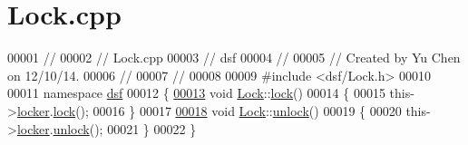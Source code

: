 \hypertarget{_lock_8cpp_source}{}\section{Lock.\+cpp}
\label{_lock_8cpp_source}

\begin{DoxyCode}
00001 \textcolor{comment}{//}
00002 \textcolor{comment}{//  Lock.cpp}
00003 \textcolor{comment}{//  dsf}
00004 \textcolor{comment}{//}
00005 \textcolor{comment}{//  Created by Yu Chen on 12/10/14.}
00006 \textcolor{comment}{//}
00007 \textcolor{comment}{//}
00008 
00009 \textcolor{preprocessor}{#}\textcolor{preprocessor}{include} \textcolor{preprocessor}{<}\textcolor{preprocessor}{dsf}\textcolor{preprocessor}{/}\textcolor{preprocessor}{Lock}\textcolor{preprocessor}{.}\textcolor{preprocessor}{h}\textcolor{preprocessor}{>}
00010 
00011 \textcolor{keyword}{namespace} \hyperlink{namespacedsf_aa16e735f29587f4485b56fc46746f7a9}{dsf}
00012 \{
\hypertarget{_lock_8cpp_source_l00013}{}\hyperlink{classdsf_1_1_lock_ae521388d861fe66b9c6e2f09811b0d4b}{00013}     \textcolor{keywordtype}{void} \hyperlink{namespacedsf_aa16e735f29587f4485b56fc46746f7a9}{Lock}::\hyperlink{namespacedsf_aa16e735f29587f4485b56fc46746f7a9}{lock}()
00014     \{
00015         \textcolor{keyword}{this}->\hyperlink{namespacedsf_aa16e735f29587f4485b56fc46746f7a9}{locker}.\hyperlink{namespacedsf_aa16e735f29587f4485b56fc46746f7a9}{lock}();
00016     \}
00017 
\hypertarget{_lock_8cpp_source_l00018}{}\hyperlink{classdsf_1_1_lock_a3d03f801920d458b3c3c402a0f4af323}{00018}     \textcolor{keywordtype}{void} \hyperlink{namespacedsf_aa16e735f29587f4485b56fc46746f7a9}{Lock}::\hyperlink{namespacedsf_aa16e735f29587f4485b56fc46746f7a9}{unlock}()
00019     \{
00020         \textcolor{keyword}{this}->\hyperlink{namespacedsf_aa16e735f29587f4485b56fc46746f7a9}{locker}.\hyperlink{namespacedsf_aa16e735f29587f4485b56fc46746f7a9}{unlock}();
00021     \}
00022 \}
\end{DoxyCode}

